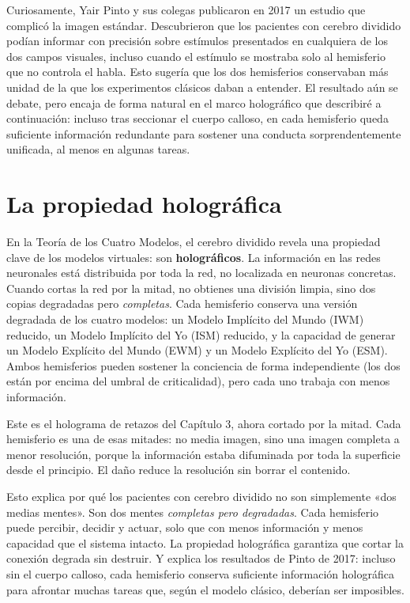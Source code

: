 \documentclass[11pt, twoside, openright]{book}
\begin{document}
Curiosamente, Yair Pinto y sus colegas publicaron en 2017 un estudio que complicó la imagen estándar. Descubrieron que los pacientes con cerebro dividido podían informar con precisión sobre estímulos presentados en cualquiera de los dos campos visuales, incluso cuando el estímulo se mostraba solo al hemisferio que no controla el habla. Esto sugería que los dos hemisferios conservaban más unidad de la que los experimentos clásicos daban a entender. El resultado aún se debate, pero encaja de forma natural en el marco holográfico que describiré a continuación: incluso tras seccionar el cuerpo calloso, en cada hemisferio queda suficiente información redundante para sostener una conducta sorprendentemente unificada, al menos en algunas tareas.

\section*{La propiedad holográfica}

En la Teoría de los Cuatro Modelos, el cerebro dividido revela una propiedad clave de los modelos virtuales: son \textbf{holográficos}. La información en las redes neuronales está distribuida por toda la red, no localizada en neuronas concretas. Cuando cortas la red por la mitad, no obtienes una división limpia, sino dos copias degradadas pero \textit{completas}. Cada hemisferio conserva una versión degradada de los cuatro modelos: un Modelo Implícito del Mundo (IWM) reducido, un Modelo Implícito del Yo (ISM) reducido, y la capacidad de generar un Modelo Explícito del Mundo (EWM) y un Modelo Explícito del Yo (ESM). Ambos hemisferios pueden sostener la conciencia de forma independiente (los dos están por encima del umbral de criticalidad), pero cada uno trabaja con menos información.

Este es el holograma de retazos del Capítulo 3, ahora cortado por la mitad. Cada hemisferio es una de esas mitades: no media imagen, sino una imagen completa a menor resolución, porque la información estaba difuminada por toda la superficie desde el principio. El daño reduce la resolución sin borrar el contenido.

Esto explica por qué los pacientes con cerebro dividido no son simplemente «dos medias mentes». Son dos mentes \textit{completas pero degradadas}. Cada hemisferio puede percibir, decidir y actuar, solo que con menos información y menos capacidad que el sistema intacto. La propiedad holográfica garantiza que cortar la conexión degrada sin destruir. Y explica los resultados de Pinto de 2017: incluso sin el cuerpo calloso, cada hemisferio conserva suficiente información holográfica para afrontar muchas tareas que, según el modelo clásico, deberían ser imposibles.
\end{document}

